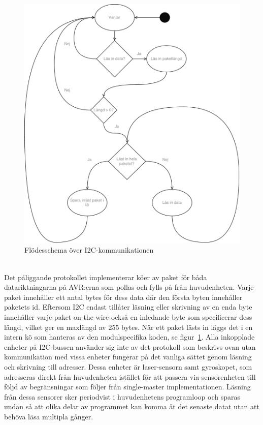 \documentclass{article}
\begin{document}
\begin{figure}[H]
\centering
\includegraphics[scale=0.45]{Flodesschema_i2c}
\caption{Flödesschema över I2C-kommunikationen}
\label{fig:flodesschema_i2c}
\end{figure}
\ \\
Det påliggande protokollet implementerar köer av paket för båda datariktningarna på AVR:erna som pollas och fylls på från huvudenheten. Varje paket innehåller ett antal bytes för dess data där den första byten innehåller paketets id. Eftersom I2C endast tillåter läsning eller skrivning av en enda byte innehåller varje paket on-the-wire också en inledande byte som specificerar dess längd, vilket ger en maxlängd av 255 bytes. När ett paket lästs in läggs det i en intern kö som hanteras av den modulspecifika koden, se figur~\ref{fig:flodesschema_i2c}.
\newline\newline
Alla inkopplade enheter på I2C-bussen använder sig inte av det protokoll som beskrivs ovan utan kommunikation med vissa enheter fungerar på det vanliga sättet genom läsning och skrivning till adresser. Dessa enheter är laser-sensorn samt gyroskopet, som adresseras direkt från huvudenheten istället för att passera via sensorenheten till följd av begränsningar som följer från single-master implementationen. Läsning från dessa sensorer sker periodvist i huvudenhetens programloop och sparas undan så att olika delar av programmet kan komma åt det senaste datat utan att behöva läsa multipla gånger.
\end{document}
